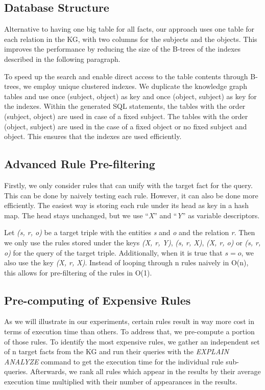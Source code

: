 \documentclass[english]{lni}
\begin{document}
\subsection{Database Structure}
\label{database-structure}
Alternative to having one big table for all facts, our approach uses one table for each relation in the KG, with two columns for the subjects and the objects. This improves the performance by reducing the size of the B-trees of the indexes described in the following paragraph.

To speed up the search and enable direct access to the table contents through B-trees, we employ unique clustered indexes. We duplicate the knowledge graph tables and use once (subject, object) as key and once (object, subject) as key for the indexes. Within the generated SQL statements, the tables with the order (subject, object) are used in case of a fixed subject. The tables with the order (object, subject) are used in the case of a fixed object or no fixed subject and object. This ensures that the indexes are used efficiently.

\subsection{Advanced Rule Pre-filtering} 
Firstly, we only consider rules that can unify with the target fact for the query. This can be done by naively testing each rule. However, it can also be done more efficiently. The easiest way is storing each rule under its head as key in a hash map. The head stays unchanged, but we use “\textit{X}” and “\textit{Y}” as variable descriptors.

Let \textit{(s, r, o)} be a target triple with the entities \textit{s} and \textit{o} and the relation \textit{r}. Then we only use the rules stored under the keys \textit{(X, r, Y)}, \textit{(s, r, X)}, \textit{(X, r, o)} or \textit{(s, r, o)} for the query of the target triple. Additionally, when it is true that \(s=o\), we also use the key \textit{(X, r, X)}. Instead of looping through n rules naively in O(n), this allows for pre-filtering of the rules in O(1).

\subsection{Pre-computing of Expensive Rules}
\label{pre-computation}
As we will illustrate in our experiments, certain rules result in way more cost in terms of execution time than others. To address that, we pre-compute a portion of those rules. To identify the most expensive rules, we gather an independent set of n target facts from the KG and run their queries with the \textit{EXPLAIN ANALYZE} command to get the execution time for the individual rule sub-queries. Afterwards, we rank all rules which appear in the results by their average execution time multiplied with their number of appearances in the results. 
\end{document}
